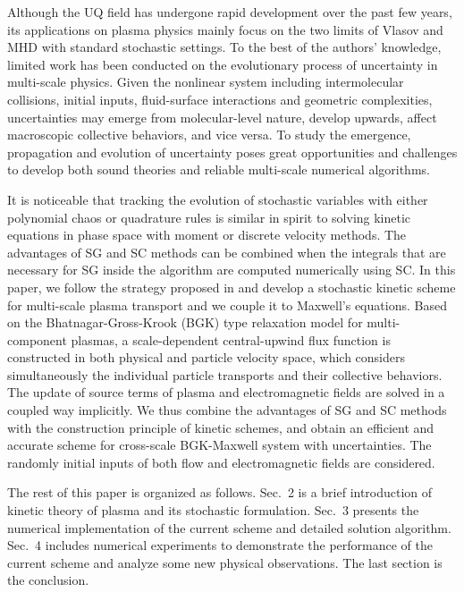 \documentclass[preprint,3p,12pt,sort&compress]{elsarticle}
\begin{document}
Although the UQ field has undergone rapid development over the past few years, its applications on plasma physics mainly focus on the two limits of Vlasov \cite{hu2016stochastic, hu2017uncertainty,jin2018hypocoercivity,ding2019random} and MHD \cite{phillips2015stochastic,yamazaki2017stochastic} with standard stochastic settings.
To the best of the authors' knowledge, limited work has been conducted on the evolutionary process of uncertainty in multi-scale physics. 
Given the nonlinear system including intermolecular collisions, initial
inputs, fluid-surface interactions and geometric complexities, uncertainties may emerge from molecular-level nature, develop upwards, affect macroscopic collective behaviors, and vice versa. 
To study the emergence, propagation and evolution of uncertainty poses great opportunities and challenges to develop both sound theories and reliable multi-scale numerical algorithms.

It is noticeable that tracking the evolution of stochastic variables with either polynomial chaos or quadrature rules is similar in spirit to solving kinetic equations in phase space with moment or discrete velocity methods.
The advantages of SG and SC methods can be combined when the integrals that are necessary for SG inside the algorithm are computed numerically using SC.
In this paper, we follow the strategy proposed in \cite{xiao2020stochastic} and develop a stochastic kinetic scheme for multi-scale plasma transport and we couple it to Maxwell's equations.
Based on the Bhatnagar-Gross-Krook (BGK) type relaxation model for multi-component plasmas, a scale-dependent central-upwind flux function is constructed in both physical and particle velocity space, which considers simultaneously the individual particle transports and their collective behaviors.
The update of source terms of plasma and electromagnetic fields are solved in a coupled way implicitly.
We thus combine the advantages of SG
and SC methods with the construction principle of kinetic schemes, and obtain an efficient and accurate scheme for cross-scale BGK-Maxwell system with uncertainties. The 
randomly initial inputs of both flow and electromagnetic fields are considered.

The rest of this paper is organized as follows. 
Sec.\ 2 is a brief introduction of kinetic theory of plasma and its stochastic formulation. 
Sec.\ 3 presents the numerical implementation of the current scheme and detailed solution algorithm. 
Sec.\ 4 includes numerical experiments to demonstrate the performance of the current scheme and analyze some new physical observations. 
The last section is the conclusion.
\end{document}
